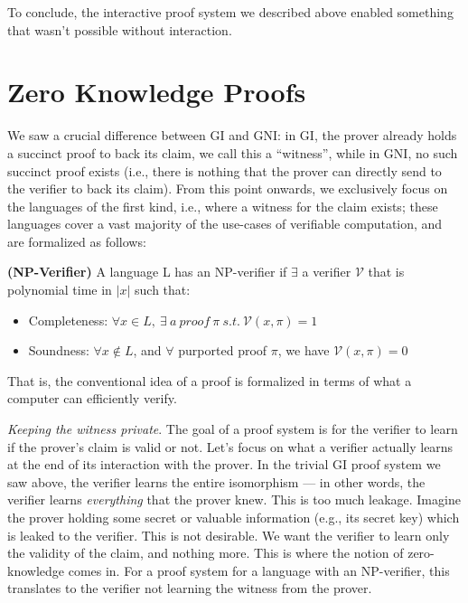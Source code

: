 		To conclude, the interactive proof system we described above enabled something that wasn't possible without interaction. 

\section{Zero Knowledge Proofs}
We saw a crucial difference between GI and GNI: in GI, the prover already holds a succinct proof to back its claim, we call this a ``witness'', while in GNI, no such succinct proof exists (i.e., there is nothing that the prover can directly send to the verifier to back its claim). From this point onwards, we exclusively focus on the languages of the first kind, i.e., where a witness for the claim exists; these languages cover a vast majority of the use-cases of verifiable computation, and are formalized as follows:

\begin{definition} {\normalfont\textbf{(NP-Verifier)}} A language L has an NP-verifier if $\exists$ a verifier $\mathcal{V}$ that is polynomial time in $|x|$ such that:
		\begin{itemize}
			\item Completeness: $\forall x\in L,\ \exists\ a\ proof\ \pi\ s.t.\ \mathcal{V}(x,\pi)=1$
			\item Soundness: $\forall x \notin L$, and $\forall$ purported proof $\pi$, we have $\mathcal{V}(x,\pi)=0$
		\end{itemize}
  \end{definition}

		That is, the conventional idea of a proof is formalized in terms of what a computer can efficiently verify.\smallskip %

	\noindent \textit{Keeping the witness private}. The goal of a proof system is for the verifier to learn if the prover's claim is valid or not. Let's focus on what a verifier actually learns at the end of its interaction with the prover. In the trivial GI proof system we saw above, the verifier learns the entire isomorphism --- in other words, the verifier learns {\em everything} that the prover knew. 
	This is too much leakage. Imagine the prover holding some secret or valuable information (e.g., its secret key) which is leaked to the verifier. This is not desirable. We want the verifier to learn only the validity of the claim, and nothing more. This is where the notion of zero-knowledge comes in.
	For a proof system for a language with an NP-verifier, this translates to the verifier not learning the witness from the prover.
	

